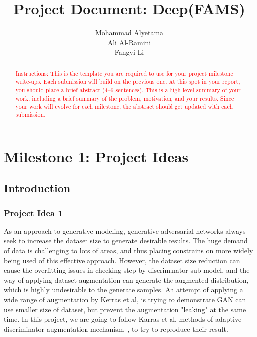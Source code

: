\documentclass{report}
\title{Project Document: Deep(FAMS)}
\author{Mohammad Alyetama \\
Ali Al-Ramini \\
Fangyi Li }
\date{}
\begin{document}
\maketitle

\tableofcontents

\begin{abstract}
\textcolor{red}{Instructions: This is the template you are required to use for your project milestone write-ups.  Each submission will build on the previous one.  At this spot in your report, you should place a brief abstract (4--6 sentences). This is a high-level summary of your work, including a brief summary of the problem, motivation, and your results.  Since your work will evolve for each milestone, the abstract should get updated with each submission.}
\end{abstract}

\chapter{Milestone 1: Project Ideas}

\section{Introduction}

\subsection{Project Idea 1}

As an approach to generative modeling, generative adversarial networks always seek to increase the dataset size to generate desirable results. The huge demand of data is challenging to lots of areas, and thus placing constrains on more widely being used of this effective approach. However, the dataset size reduction can cause the overfitting issues in checking step by discriminator sub-model, and the way of applying dataset augmentation can generate the augmented distribution, which is highly undesirable to the generate samples.
An attempt of applying a wide range of augmentation by Kerras et al, is trying to demonstrate GAN can use smaller size of dataset, but prevent the augmentation "leaking" at the same time. In this project, we are going to follow Karras et al. methods of adaptive discriminator augmentation mechanism~\cite{karras2020training}, to try to reproduce their result.
\end{document}
